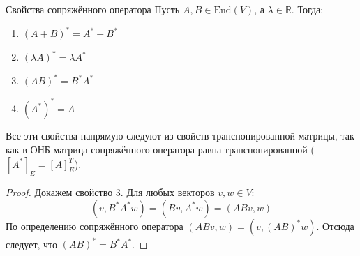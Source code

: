 \begin{Statement}{Свойства сопряжённого оператора}{}
	Пусть $A, B \in \mathrm{End}(V)$, а $\lambda \in \mathbb{R}$.
	Тогда:
	\begin{enumerate}
		\item $(A+B)^* = A^* + B^*$ 
		\item $(\lambda A)^* = \lambda A^*$ 
		\item $(AB)^* = B^* A^*$ 
		\item $(A^*)^* = A$ 
	\end{enumerate}
	Все эти свойства напрямую следуют из свойств транспонированной матрицы, так как в ОНБ матрица сопряжённого оператора равна транспонированной ($[A^*]_E = [A]_E^T$).
\end{Statement}

\begin{proof}
	Докажем свойство 3. Для любых векторов $v, w \in V$:
	\[
	(v, B^* A^* w) = (Bv, A^* w) = (ABv, w)
	\] 
	По определению сопряжённого оператора $(ABv, w) = (v, (AB)^* w)$.
	Отсюда следует, что $(AB)^* = B^* A^*$.
\end{proof}
